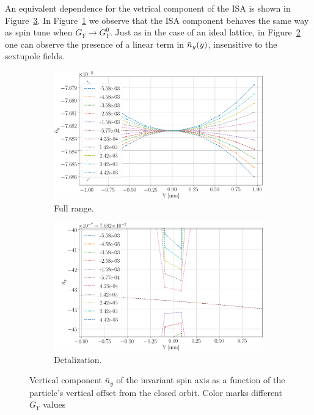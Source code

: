 An equivalent dependence for the vetrical component of the ISA is shown
in Figure~\ref{decoh:fig:ny_vs_y0_GSY}. In Figure~\ref{decoh:fig:full:ny_vs_y0_GSY} we observe
that the ISA component behaves the same way as spin tune when $G_Y \rightarrow G_Y^0$.
Just as in the case of an ideal lattice, in Figure~\ref{decoh:fig:zoom:ny_vs_y0_GSY}
one can observe the presence of a linear term in $\bar n_y(y)$, insensitive to the sextupole fields.

\begin{figure}[h!]
	\centering
	\begin{subfigure}{\linewidth}
		\includegraphics[width=\linewidth]{images/decoh_sim/ny_vs_offset}
		\caption{Full range.\label{decoh:fig:full:ny_vs_y0_GSY}}
	\end{subfigure}
	\begin{subfigure}{\linewidth}
		\includegraphics[width=\linewidth]{images/decoh_sim/ny_vs_offset_zoom}
		\caption{Detalization.\label{decoh:fig:zoom:ny_vs_y0_GSY}}
	\end{subfigure}
	\caption{Vertical component $\bar n_y$ of the invariant spin axis as a function of the particle's
          vertical offset from the closed orbit.
          Color marks different $G_Y$ values\label{decoh:fig:ny_vs_y0_GSY}}
\end{figure}

